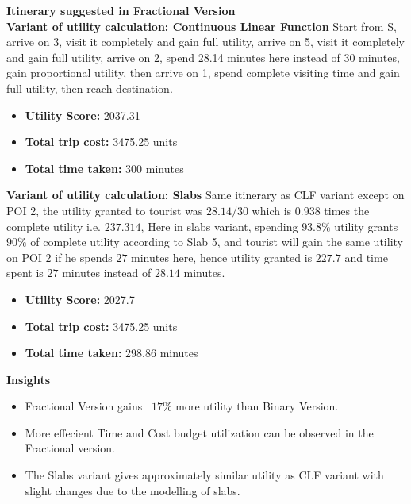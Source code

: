 {\noindent \textbf{Itinerary suggested in Fractional Version}\\
\textbf{Variant of utility calculation: Continuous Linear Function}
Start from S, arrive on 3, visit it completely and gain full utility, arrive on 5, visit it completely and gain full utility, arrive on 2, spend 28.14 minutes here instead of 30 minutes, gain proportional utility, then arrive on 1, spend complete visiting time and gain full utility, then reach destination.
\begin{itemize}
    \item \textbf{Utility Score:} 2037.31
    \item \textbf{Total trip cost:} 3475.25 units
    \item \textbf{Total time taken:} 300 minutes
\end{itemize}

\noindent \textbf{Variant of utility calculation: Slabs}
Same itinerary as CLF variant except on POI 2, the utility granted to tourist was $28.14/30$
which is $0.938$ times the complete utility i.e. $237.314$, Here in slabs variant, spending $93.8\%$ utility grants $90\%$ of complete utility according to Slab 5, and tourist will gain the same utility on POI 2 if he spends $27$ minutes here, hence utility granted is $227.7$ and time spent is $27$ minutes instead of $28.14$ minutes.
\begin{itemize}
    \item \textbf{Utility Score:} 2027.7
    \item \textbf{Total trip cost:} 3475.25 units
    \item \textbf{Total time taken:} 298.86 minutes
\end{itemize}

\noindent \textbf{Insights}
\begin{itemize}
    \item Fractional Version gains ~$17\%$ more utility than Binary Version.
    \item More effecient Time and Cost budget utilization can be observed in the Fractional version.
    \item The Slabs variant gives approximately similar utility as CLF variant with slight changes due to the modelling of slabs.
\end{itemize}

}

